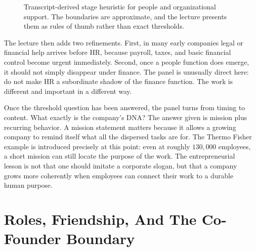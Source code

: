 \begin{figure}
\centering
{}
\caption{Transcript-derived stage heuristic for people and organizational support. The boundaries are approximate, and the lecture presents them as rules of thumb rather than exact thresholds.}
\end{figure}

The lecture then adds two refinements. First, in many early companies legal or financial help arrives before HR, because payroll, taxes, and basic financial control become urgent immediately. Second, once a people function does emerge, it should not simply disappear under finance. The panel is unusually direct here: do not make HR a subordinate shadow of the finance function. The work is different and important in a different way.

Once the threshold question has been answered, the panel turns from timing to content. What exactly is the company's DNA? The answer given is mission plus recurring behavior. A mission statement matters because it allows a growing company to remind itself what all the dispersed tasks are for. The Thermo Fisher example is introduced precisely at this point: even at roughly \(130{,}000\) employees, a short mission can still locate the purpose of the work. The entrepreneurial lesson is not that one should imitate a corporate slogan, but that a company grows more coherently when employees can connect their work to a durable human purpose.

\section{Roles, Friendship, And The Co-Founder Boundary}


